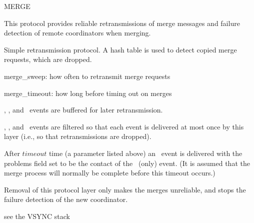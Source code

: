 \begin{Layer}{MERGE}

This protocol provides reliable retransmissions of merge messages and failure
detection of remote coordinators when merging.

\begin{Protocol}
Simple retransmission protocol.  A hash table is used to detect copied
merge requests, which are dropped.
\end{Protocol}

\begin{Parameters}
\item
merge\_sweep: how often to retransmit merge requests
\item
merge\_timeout: how long before timing out on merges
\end{Parameters}

\begin{Properties}
\item
\DnMerge, \DnMergeGranted, and \DnMergeDenied\ events are buffered for later
retransmission.
\item
\UpMergeRequest, \UpMergeGranted, and \UpMergeDenied\ events are filtered
so that each event is delivered at most once by this layer (i.e., so that
retransmissions are dropped).
\item
After $timeout$ time (a parameter listed above) an \UpMergeFailed\ event is
delivered with the problems field set to be the contact of the \DnMerge\
(only) event.  (It is assumed that the merge process will normally be
complete before this timeout occurs.)
\end{Properties}

\begin{Notes}
\item
Removal of this protocol layer only makes the merges unreliable, and
stops the failure detection of the new coordinator.
\end{Notes}

\begin{Sources}
\end{Sources}

\begin{GenEvent}
\genevent{\UpSuspect}
\genevent{\DnMerge}
\genevent{\DnTimer}
\end{GenEvent}

\begin{Testing}
\item see the VSYNC stack
\end{Testing}
\end{Layer}
